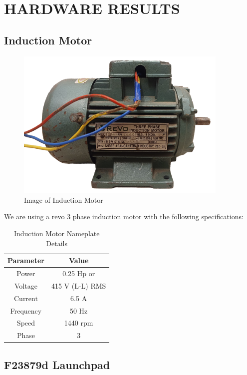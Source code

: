 \section{HARDWARE RESULTS}

\subsection{Induction Motor}

\begin{figure}[H]
	\centering
	\includegraphics[width=4.0in]{sections/section4/images/inductionMotor/revo.png}
	\caption{Image of Induction Motor}
\end{figure}

We are using a revo 3 phase induction motor with the following specifications:

\begin{table}[H]
	\centering
	\begin{tabular}{|c|c|}
		\hline
		\textbf{Parameter} & \textbf{Value} \\ \hline
		Power & 0.25 Hp or  \\ \hline
		Voltage & 415 V (L-L) RMS \\ \hline
		Current & 6.5 A \\ \hline
		Frequency & 50 Hz \\ \hline
		Speed & 1440 rpm \\ \hline
		Phase & 3 \\ \hline
	\end{tabular}
	\caption{Induction Motor Nameplate Details}
\end{table}



\subsection{F23879d Launchpad}

